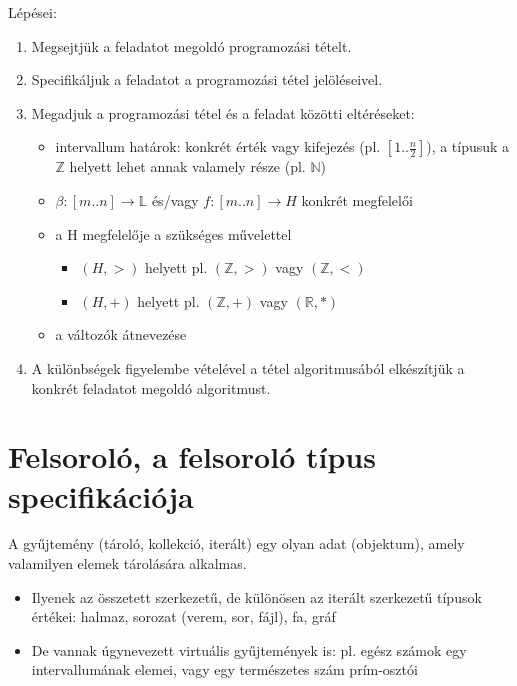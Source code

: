 \documentclass[margin=0px]{article}
\begin{document}
\noindent Lépései:
\begin{enumerate}
    \item	Megsejtjük a feladatot megoldó programozási tételt.
    \item	Specifikáljuk a feladatot a programozási tétel jelöléseivel.
    \item	Megadjuk a programozási tétel és a feladat közötti eltéréseket:
          \begin{itemize}
              \item	intervallum határok: konkrét érték vagy kifejezés (pl. $[1..\frac{n}{2}]$),
                    a típusuk a $\mathbb{Z}$ helyett lehet annak valamely része (pl. $\mathbb{N}$)

              \item	$\beta:[m..n] \to \mathbb{L}$ és/vagy $f:[m..n] \to H$ konkrét megfelelői

              \item	a H megfelelője a szükséges művelettel
                    \begin{itemize}
                        \item	$(H,>)$ helyett pl. $(\mathbb{Z},>)$ vagy $(\mathbb{Z},<)$
                        \item	$(H,+)$ helyett pl. $(\mathbb{Z},+)$ vagy $(\mathbb{R},*)$
                    \end{itemize}
              \item	a változók átnevezése
          \end{itemize}
    \item	A különbségek figyelembe vételével a tétel algoritmusából elkészítjük a konkrét feladatot megoldó algoritmust.
\end{enumerate}

\section{Felsoroló, a felsoroló típus specifikációja}

A gyűjtemény (tároló, kollekció, iterált) egy olyan adat
(objektum), amely valamilyen elemek tárolására alkalmas.
\begin{itemize}
    \item	Ilyenek az összetett szerkezetű, de különösen az iterált szerkezetű
          típusok értékei: halmaz, sorozat (verem, sor, fájl), fa, gráf

    \item	De vannak úgynevezett virtuális gyűjtemények is: pl. egész számok
          egy intervallumának elemei, vagy egy természetes szám prím-osztói
\end{itemize}
\end{document}
